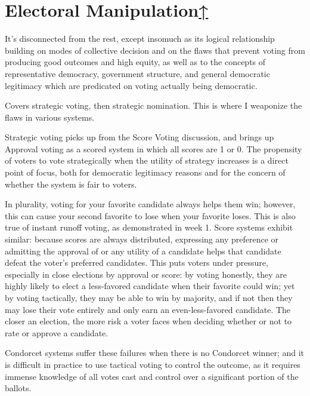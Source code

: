 \label{cur:manipulation}
\section{Electoral Manipulation\hyperref[syllabus]{↑}}

\begin{boxcomment}
    It's disconnected from the rest, except insomuch as its logical relationship building on modes of collective decision and on the flaws that prevent voting from producing good outcomes and high equity, as well as to the concepts of representative democracy, government structure, and general democratic legitimacy which are predicated on voting actually being democratic.
\end{boxcomment}

Covers strategic voting, then strategic nomination.  This is where I weaponize the flaws in various systems.

Strategic voting picks up from the Score Voting discussion, and brings up Approval voting as a scored system in which all scores are 1 or 0.  The propensity of voters to vote strategically when the utility of strategy increases is a direct point of focus, both for democratic legitimacy reasons and for the concern of whether the system is fair to voters.

In plurality, voting for your favorite candidate always helps them win; however, this can cause your second favorite to lose when your favorite loses.  This is also true of instant runoff voting, as demonstrated in week 1.  Score systems exhibit similar:  because scores are always distributed, expressing any preference or admitting the approval of or any utility of a candidate helps that candidate defeat the voter's preferred candidates.  This puts voters under pressure, especially in close elections by approval or score:  by voting honestly, they are highly likely to elect a less-favored candidate when their favorite could win; yet by voting tactically, they may be able to win by majority, and if not then they may lose their vote entirely and only earn an even-less-favored candidate.  The closer an election, the more risk a voter faces when deciding whether or not to rate or approve a candidate.

Condorcet systems suffer these failures when there is no Condorcet winner; and it is difficult in practice to use tactical voting to control the outcome, as it requires immense knowledge of all votes cast and control over a significant portion of the ballots.

